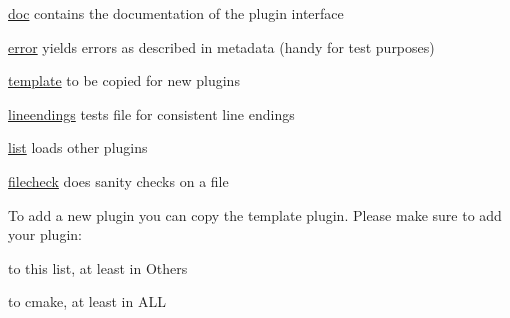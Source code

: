 \begin{DoxyItemize}
\item \hyperlink{md_src_plugins_doc_README_src_plugins_doc_README_md}{doc} contains the documentation of the plugin interface
\item \hyperlink{md_src_plugins_error_README_src_plugins_error_README_md}{error} yields errors as described in metadata (handy for test purposes)
\item \hyperlink{md_src_plugins_template_README_src_plugins_template_README_md}{template} to be copied for new plugins
\item \hyperlink{md_src_plugins_lineendings_README_src_plugins_lineendings_README_md}{lineendings} tests file for consistent line endings
\item \hyperlink{md_src_plugins_list_README_src_plugins_list_README_md}{list} loads other plugins
\item \hyperlink{md_src_plugins_filecheck_README_src_plugins_filecheck_README_md}{filecheck} does sanity checks on a file
\end{DoxyItemize}

To add a new plugin you can copy the template plugin. Please make sure to add your plugin\+:


\begin{DoxyItemize}
\item to this list, at least in Others
\item to cmake, at least in A\+L\+L 
\end{DoxyItemize}